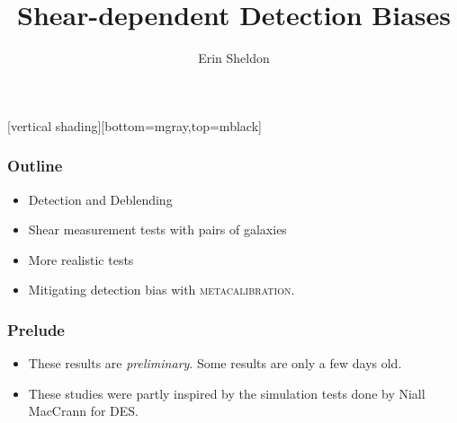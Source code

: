 \documentclass{beamer}
\title{Shear-dependent Detection Biases}
\author{Erin Sheldon}
\institute{Brookhaven National Laboratory}
\newcommand{\mcal}{\textsc{metacalibration}}
\begin{document}
\frame
{
}




\frame{\titlepage}

[vertical shading][bottom=mgray,top=mblack]





\frame
{
    \frametitle{Outline}

    \begin{itemize}

        \item Detection and Deblending
        \item Shear measurement tests with pairs of galaxies
        \item More realistic tests
        \item Mitigating detection bias with \mcal.

    \end{itemize}

}

\frame
{
    \frametitle{Prelude}

 
    \begin{itemize}

        \item These results are {\em preliminary}.  Some results are only
                a few days old.

        \item These studies were partly inspired by the simulation tests
            done by Niall MacCrann for DES.

    \end{itemize}

}
\end{document}

